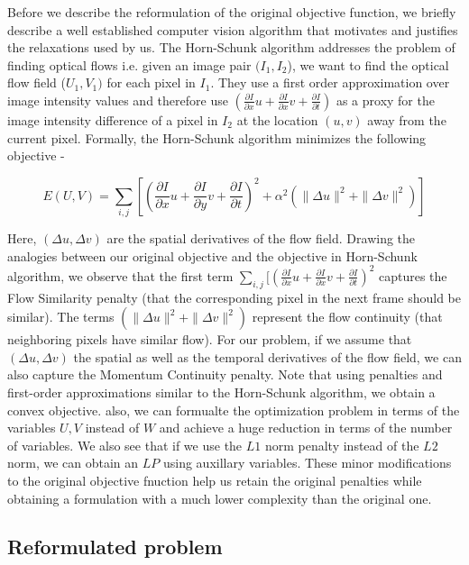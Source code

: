 Before we describe the reformulation of the original objective function,
we briefly describe a well established computer vision algorithm that
motivates and justifies the relaxations used by us. The Horn-Schunk
algorithm \cite{HornSchunk} addresses the problem of finding optical
flows i.e. given an image pair $(I_{1},I_{2}$), we want to find the
optical flow field ($U_{1},V_{1})$ for each pixel in $I_{1}$. They
use a first order approximation over image intensity values and therefore
use $(\frac{\partial I}{\partial x}u+\frac{\partial I}{\partial x}v+\frac{\partial I}{\partial t})$
as a proxy for the image intensity difference of a pixel in $I_{2}$
at the location $(u,v)$ away from the current pixel. Formally, the
Horn-Schunk algorithm minimizes the following objective -

\begin{equation}
E(U,V)=\underset{i,j}{\sum}[(\frac{\partial I}{\partial x}u+\frac{\partial I}{\partial y}v+\frac{\partial I}{\partial t})^{2}+\alpha^{2}(\|\Delta u\|^{2}+\|\Delta v\|^{2})]
\end{equation}


Here, $(\Delta u,\Delta v)$ are the spatial derivatives of the flow
field. Drawing the analogies between our original objective and the
objective in Horn-Schunk algorithm, we observe that the first term
$\underset{i,j}{\sum}[(\frac{\partial I}{\partial x}u+\frac{\partial I}{\partial x}v+\frac{\partial I}{\partial t})^{2}$
captures the Flow Similarity penalty (that the corresponding pixel
in the next frame should be similar). The terms $ $$(\|\Delta u\|^{2}+\|\Delta v\|^{2})$
represent the flow continuity (that neighboring pixels have similar
flow). For our problem, if we assume that $(\Delta u,\Delta v)$ the
spatial as well as the temporal derivatives of the flow field, we
can also capture the Momentum Continuity penalty. Note that using
penalties and first-order approximations similar to the Horn-Schunk
algorithm, we obtain a convex objective. also, we can formualte the
optimization problem in terms of the variables $U,V$ instead of $W$
and achieve a huge reduction in terms of the number of variables.
We also see that if we use the $L1$ norm penalty instead of the $L2$
norm, we can obtain an $LP$ using auxillary variables. These minor
modifications to the original objective fnuction help us retain the
original penalties while obtaining a formulation with a much lower
complexity than the original one.


\subsection{Reformulated problem}

